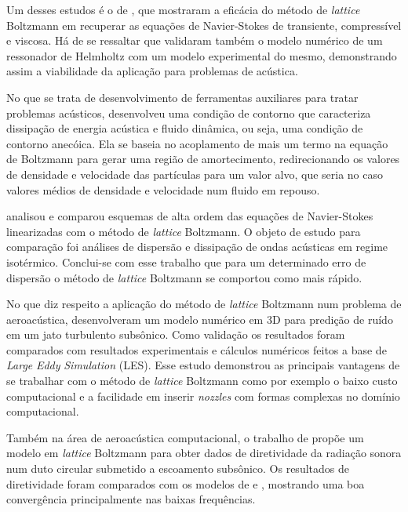 Um desses estudos é o de , que mostraram a eficácia do método de \textit{lattice} Boltzmann em recuperar as equações de Navier-Stokes de transiente, compressível e viscosa. Há de se ressaltar que validaram também o modelo numérico de um ressonador de Helmholtz com um modelo experimental do mesmo, demonstrando assim a viabilidade da aplicação para problemas de acústica.

No que se trata de desenvolvimento de ferramentas auxiliares para tratar problemas acústicos,  desenvolveu uma condição de contorno que caracteriza dissipação de energia acústica e fluido dinâmica, ou seja, uma condição de contorno anecóica. Ela se baseia no acoplamento de mais um termo na equação de Boltzmann para gerar uma região de amortecimento, redirecionando os valores de densidade e velocidade das partículas para um valor alvo, que seria no caso valores médios de densidade e velocidade num fluido em repouso.

 analisou e comparou esquemas de alta ordem das equações de Navier-Stokes linearizadas com o método de \textit{lattice} Boltzmann. O objeto de estudo para comparação foi análises de dispersão e dissipação de ondas acústicas em regime isotérmico. Conclui-se com esse trabalho que para um determinado erro de dispersão o método de \textit{lattice} Boltzmann se comportou como mais rápido.

No que diz respeito a aplicação do método de \textit{lattice} Boltzmann num problema de aeroacústica,  desenvolveram um modelo numérico em 3D para predição de ruído em um jato turbulento subsônico. Como validação os resultados foram comparados com resultados experimentais e cálculos numéricos feitos a base de \textit{Large} \textit{Eddy} \textit{Simulation} (LES). Esse estudo demonstrou as principais vantagens de se trabalhar com o método de \textit{lattice} Boltzmann como por exemplo o baixo custo computacional e a facilidade em inserir \textit{nozzles} com formas complexas no domínio computacional.

Também na área de aeroacústica computacional, o trabalho de  propõe um modelo em \textit{lattice} Boltzmann para obter dados de diretividade da radiação sonora num duto circular submetido a escoamento subsônico. Os resultados de diretividade foram comparados com os modelos de  e , mostrando uma boa convergência principalmente nas baixas frequências.

